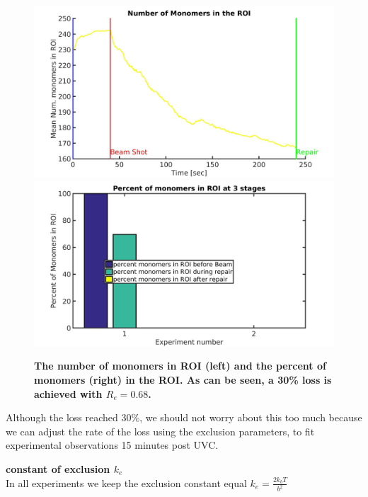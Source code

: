 \documentclass[12pt]{report}
\begin{document}
	\begin{figure}[H]
	\includegraphics[width=0.5\linewidth, height=0.3\textheight]{Images/ExludeAroundDamagedMonomers/BreakDamagedCrosslinks/testExpansion/meannumberOfMonomersInROI}
	\includegraphics[width=0.5\linewidth, height=0.3\textheight]{Images/ExludeAroundDamagedMonomers/BreakDamagedCrosslinks/testExpansion/percentOfMonomersInROI}
	\caption{\tiny{\textbf{The number of monomers in ROI (left) and the percent of monomers (right) in the ROI. As can be seen, a 30\% loss is achieved with $R_e=0.68$.}}}
	\label{fig:meannumberOfMonomersInROI}
	\end{figure}
	 Although the loss reached 30\%, we should not worry about this too much because we can adjust the rate of the loss using the exclusion parameters, to fit experimental observations 15 minutes post UVC.
	 
   \textbf{\large{constant of exclusion $k_e$}}\\
   In all experiments we keep the exclusion constant equal $k_e=\frac{2k_bT}{b^2}$\\ 
   
\end{document}
